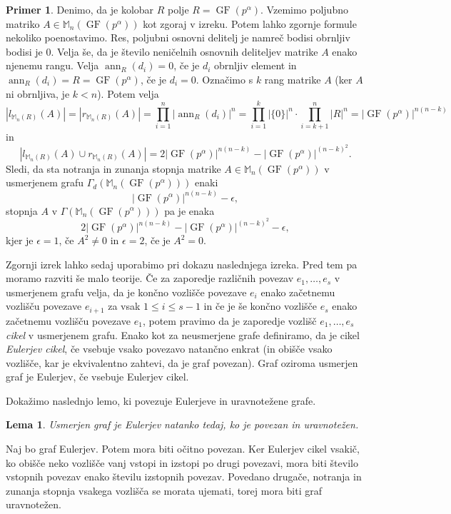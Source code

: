\documentclass[a4paper, 12pt]{amsart}
\theoremstyle{definition} %
\newtheorem{primer}[definicija]{Primer}
\theoremstyle{plain} %
\newtheorem{lema}[definicija]{Lema}
\newcommand{\M}{\mathbb M}
\DeclareMathOperator{\ann}{ann}
\DeclareMathOperator{\GF}{GF}
\begin{document}
\begin{primer}
Denimo, da je kolobar $R$ polje $R=\GF(p^{\alpha})$. Vzemimo poljubno matriko $A\in \M_n(\GF(p^{\alpha}))$ kot zgoraj v izreku. Potem lahko zgornje formule nekoliko poenostavimo. Res, poljubni osnovni delitelj je namreč bodisi obrnljiv bodisi je 0. Velja še, da je število neničelnih osnovnih deliteljev matrike $A$ enako njenemu rangu. Velja $\ann_R(d_i) = 0$, če je $d_i$ obrnljiv element in $\ann_R(d_i) = R=\GF(p^{\alpha})$, če je $d_i=0$. Označimo s $k$ rang matrike $A$ (ker $A$ ni obrnljiva, je $k<n$). Potem velja 
$$
|l_{\M_n(R)}(A)| = |r_{\M_n(R)}(A)|=\prod_{i=1}^n|\ann_R(d_i)|^n = \prod_{i=1}^k |\{0\}|^n\cdot \prod_{i=k+1}^n |R|^{n} =|\GF(p^{\alpha})|^{n(n-k)}
$$
in
$$
|l_{\M_n(R)} (A) \cup r_{\M_n(R)}(A)| = 2|\GF(p^{\alpha})|^{n(n-k)} - |\GF(p^{\alpha})|^{(n-k)^2}.
$$
Sledi, da sta notranja in zunanja stopnja matrike $A\in \M_n(\GF(p^{\alpha}))$ v usmerjenem grafu $\Gamma_d(\M_n(\GF(p^{\alpha})))$ enaki 
$$
|\GF(p^{\alpha})|^{n(n-k)} - \epsilon,
$$
stopnja $A$ v $\Gamma (\M_n(\GF(p^{\alpha})))$ pa je enaka
$$
 2|\GF(p^{\alpha})|^{n(n-k)} - |\GF(p^{\alpha})|^{(n-k)^2} - \epsilon,
$$
kjer je $\epsilon=1$, če $A^2\neq 0$ in $\epsilon = 2$, če je $A^2 = 0$. 
\end{primer}

Zgornji izrek lahko sedaj uporabimo pri dokazu naslednjega izreka. Pred tem pa moramo razviti še malo teorije. Če za zaporedje različnih povezav $e_1, \dots, e_s$ v usmerjenem grafu velja, da je končno vozlišče povezave $e_i$ enako začetnemu vozlišču povezave $e_{i+1}$ za vsak $1 \le i \le s-1$ in če je še končno vozlišče $e_s$ enako začetnemu vozlišču povezave $e_1$, potem pravimo da je zaporedje vozlišč $e_1,\dots,e_s$ \emph{cikel} v usmerjenem grafu. Enako kot za neusmerjene grafe definiramo, da je cikel \emph{Eulerjev cikel}, če vsebuje vsako povezavo natančno enkrat (in obišče vsako vozlišče, kar je ekvivalentno zahtevi, da je graf povezan). Graf oziroma usmerjen graf je Eulerjev, če vsebuje Eulerjev cikel.

Dokažimo naslednjo lemo, ki povezuje Eulerjeve in uravnotežene grafe.
\begin{lema}
\label{usmerjenGrafEuler}
Usmerjen graf je Eulerjev natanko tedaj, ko je povezan in uravnotežen.
\end{lema}

\proof
Naj bo graf Eulerjev. Potem mora biti očitno povezan. Ker Eulerjev cikel vsakič, ko obišče neko vozlišče vanj vstopi in izstopi po drugi povezavi, mora biti število vstopnih povezav enako številu izstopnih povezav. Povedano drugače, notranja in zunanja stopnja vsakega vozlišča se morata ujemati, torej mora biti graf uravnotežen.
\end{document}
